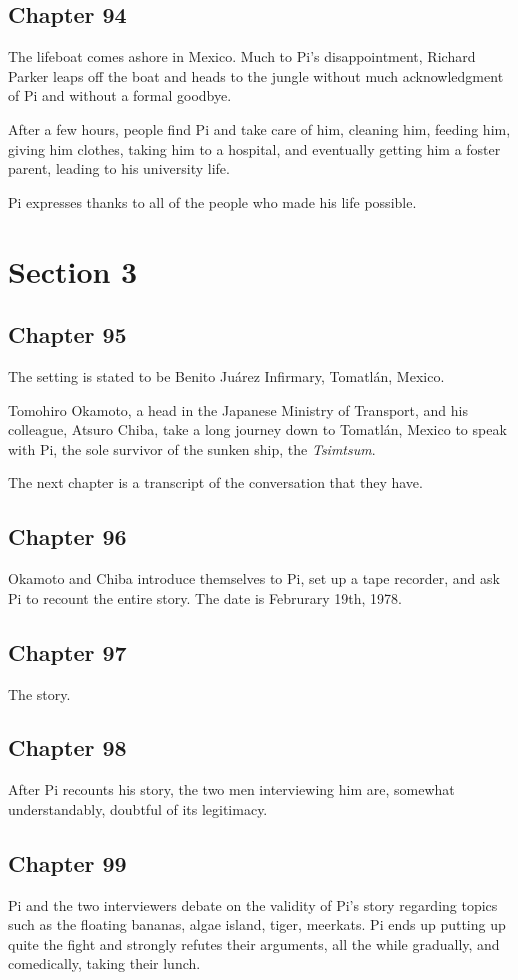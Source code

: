 \documentclass[11pt]{article}
\begin{document}
\subsection{Chapter 94}
\label{sec:orgc3b15fe}
The lifeboat comes ashore in Mexico. Much to Pi's disappointment, Richard Parker leaps off the boat and heads to the jungle without much acknowledgment of Pi and without a formal goodbye.

After a few hours, people find Pi and take care of him, cleaning him, feeding him, giving him clothes, taking him to a hospital, and eventually getting him a foster parent, leading to his university life.

Pi expresses thanks to all of the people who made his life possible.
\section{Section 3}
\label{sec:org701d7bd}
\subsection{Chapter 95}
\label{sec:org0bd4c38}
The setting is stated to be Benito Juárez Infirmary, Tomatlán, Mexico.

Tomohiro Okamoto, a head in the Japanese Ministry of Transport, and his colleague, Atsuro Chiba, take a long journey down to Tomatlán, Mexico to speak with Pi, the sole survivor of the sunken ship, the \emph{Tsimtsum}.

The next chapter is a transcript of the conversation that they have.
\subsection{Chapter 96}
\label{sec:orgc83ecf4}
Okamoto and Chiba introduce themselves to Pi, set up a tape recorder, and ask Pi to recount the entire story. The date is Februrary 19th, 1978.
\subsection{Chapter 97}
\label{sec:orgbc188f3}
The story.
\subsection{Chapter 98}
\label{sec:orgda6267f}
After Pi recounts his story, the two men interviewing him are, somewhat understandably, doubtful of its legitimacy.
\subsection{Chapter 99}
\label{sec:org75b5a39}
Pi and the two interviewers debate on the validity of Pi's story regarding topics such as the floating bananas, algae island, tiger, meerkats. Pi ends up putting up quite the fight and strongly refutes their arguments, all the while gradually, and comedically, taking their lunch.
\end{document}
